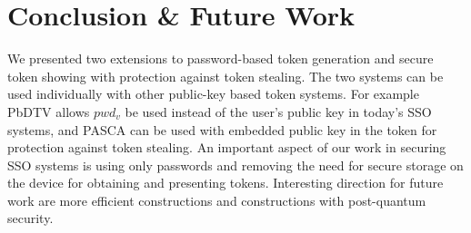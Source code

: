 \documentclass[conference]{IEEEtran}
\begin{document}
\section{Conclusion \& Future Work}
\label{sec:Conclusion}
We presented two extensions to 
password-based token generation and secure token showing with protection against token stealing.
The two systems can be used individually with other public-key based token systems. For example PbDTV allows $pwd_v$ be used instead of the user's public key in today's SSO systems, and PASCA can be used with embedded public key in the token for protection against token stealing.
An important aspect of our work in securing SSO systems is using only passwords and removing the need for secure storage on the device for %
obtaining and presenting tokens. %
Interesting direction for future work are more efficient constructions and constructions with post-quantum security.











%






\end{document}
